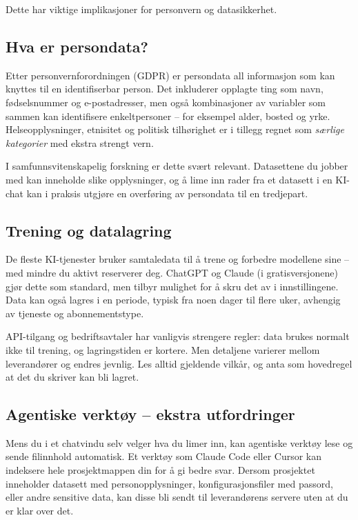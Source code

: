 \documentclass[
  norsk,
  letterpaper,
  DIV=11,
  numbers=noendperiod]{scrreprt}
\theoremstyle{definition}
\theoremstyle{remark}
\begin{document}
Dette har viktige implikasjoner for personvern og datasikkerhet.

\subsection{Hva er persondata?}\label{hva-er-persondata}

Etter personvernforordningen (GDPR) er persondata all informasjon som
kan knyttes til en identifiserbar person. Det inkluderer opplagte ting
som navn, fødselsnummer og e-postadresser, men også kombinasjoner av
variabler som sammen kan identifisere enkeltpersoner -- for eksempel
alder, bosted og yrke. Helseopplysninger, etnisitet og politisk
tilhørighet er i tillegg regnet som \emph{særlige kategorier} med ekstra
strengt vern.

I samfunnsvitenskapelig forskning er dette svært relevant. Datasettene
du jobber med kan inneholde slike opplysninger, og å lime inn rader fra
et datasett i en KI-chat kan i praksis utgjøre en overføring av
persondata til en tredjepart.

\subsection{Trening og datalagring}\label{trening-og-datalagring}

De fleste KI-tjenester bruker samtaledata til å trene og forbedre
modellene sine -- med mindre du aktivt reserverer deg. ChatGPT og Claude
(i gratisversjonene) gjør dette som standard, men tilbyr mulighet for å
skru det av i innstillingene. Data kan også lagres i en periode, typisk
fra noen dager til flere uker, avhengig av tjeneste og abonnementstype.

API-tilgang og bedriftsavtaler har vanligvis strengere regler: data
brukes normalt ikke til trening, og lagringstiden er kortere. Men
detaljene varierer mellom leverandører og endres jevnlig. Les alltid
gjeldende vilkår, og anta som hovedregel at det du skriver kan bli
lagret.

\subsection{Agentiske verktøy -- ekstra
utfordringer}\label{agentiske-verktuxf8y-ekstra-utfordringer}

Mens du i et chatvindu selv velger hva du limer inn, kan agentiske
verktøy lese og sende filinnhold automatisk. Et verktøy som Claude Code
eller Cursor kan indeksere hele prosjektmappen din for å gi bedre svar.
Dersom prosjektet inneholder datasett med personopplysninger,
konfigurasjonsfiler med passord, eller andre sensitive data, kan disse
bli sendt til leverandørens servere uten at du er klar over det.
\end{document}
